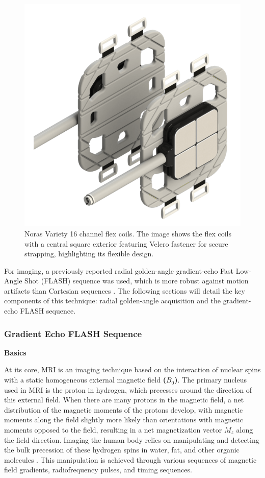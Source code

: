 \documentclass{micro-econ-thesis}
\begin{document}
\begin{figure}[H]
	\centering
	\includegraphics[scale=0.2]{coils}
	\caption{Noras Variety 16 channel flex coils. The image shows the flex coils with a central square exterior featuring Velcro fastener for secure strapping, highlighting its flexible design.}
	\label{fig:coils}
\end{figure}
  
For imaging, a previously reported radial golden-angle gradient-echo Fast Low-Angle Shot (FLASH) sequence was used, which is more robust against motion artifacts than Cartesian sequences \parencite{aleksiev_high-resolution_2022}. The following sections will detail the key components of this technique: radial golden-angle acquisition and the gradient-echo FLASH sequence.

\subsubsection{Gradient Echo FLASH Sequence}

\textbf{Basics}

At its core, MRI is an imaging technique based on the interaction of nuclear spins with a static homogeneous external magnetic field \textbf{($B_0$)}. The primary nucleus used in MRI is the proton in hydrogen, which precesses around the direction of this external field.  When there are many protons in the magnetic field, a net distribution of the magnetic moments of the protons develop, with magnetic moments along the field slightly more likely than orientations with magnetic moments opposed to the field, resulting in a net magnetization vector \textbf{$M_z$} along the field direction. Imaging the human body relies on manipulating and detecting the bulk precession of these hydrogen spins in water, fat, and other organic molecules \parencite{brown_magnetic_2014}. This manipulation is achieved through various sequences of magnetic field gradients, radiofrequency pulses, and timing sequences. 
\end{document}
